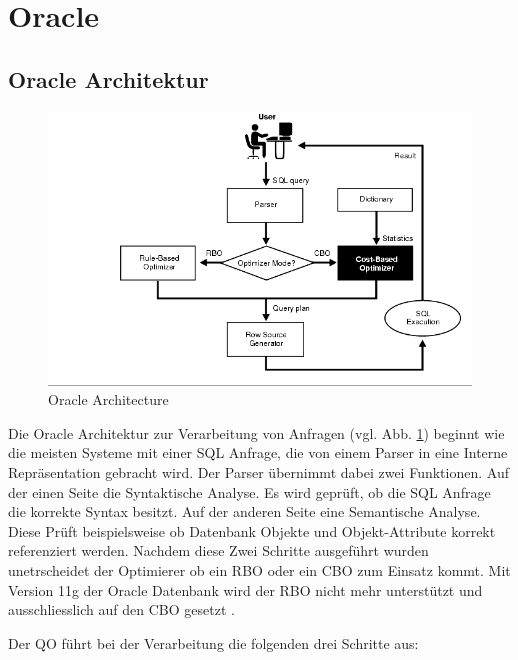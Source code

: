 \section{Oracle}
\subsection{Oracle Architektur}


\begin{figure}[h]
  \centering
  \includegraphics[width=\textwidth]{03_Related_Work/OracleArchitecture.png}
  \caption{Oracle Architecture \cite{Oracle2004Basics}}
  \label{OracleArchitecture}
\end{figure}



Die Oracle Architektur zur Verarbeitung von Anfragen \cite{Oracle2004Basics} (vgl. Abb. \ref{OracleArchitecture})  beginnt wie die meisten Systeme mit einer SQL Anfrage, die von einem Parser in eine Interne Repräsentation gebracht wird. Der Parser übernimmt dabei zwei Funktionen. Auf der einen Seite die Syntaktische Analyse. Es wird geprüft, ob die SQL Anfrage die korrekte Syntax besitzt. Auf der anderen Seite eine Semantische Analyse. Diese Prüft beispielsweise ob Datenbank Objekte und Objekt-Attribute  korrekt referenziert werden. Nachdem diese Zwei Schritte ausgeführt wurden unetrscheidet der Optimierer ob ein \ac{RBO} oder ein \ac{CBO} zum Einsatz kommt. Mit Version 11g der Oracle Datenbank wird der \ac{RBO} nicht mehr unterstützt und ausschliesslich auf den \ac{CBO} gesetzt \cite{dba_oracle2015}.

Der \ac{QO} führt bei der Verarbeitung die folgenden drei Schritte aus:

